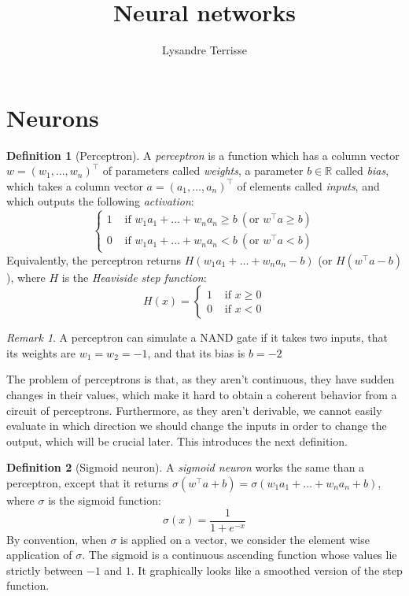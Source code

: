 \documentclass{article}
\title{Neural networks}
\author{Lysandre Terrisse}
\theoremstyle{definition}
\newtheorem{definition}{Definition}[section]
\theoremstyle{remark}
\newtheorem*{remark}{Remark}
\theoremstyle{example}
\newcommand{\tif}{\text{ if }}
\newcommand{\tor}{\text{or }}
\begin{document}
\maketitle

\section{Neurons}

\begin{definition}[Perceptron]
    A \textit{perceptron} is a function which has a column vector $w = (w_1, \dots, w_n)^\top$ of parameters called \textit{weights}, a parameter $b \in \mathbb{R}$ called \textit{bias}, which takes a column vector $a = (a_1, \dots, a_n)^\top$ of elements called \textit{inputs}, and which outputs the following \textit{activation}:
    $$\begin{cases}
        1 & \tif w_1 a_1 + \dots + w_n a_n \geq b ~ (\tor w^\top a \geq b)\\
        0 & \tif w_1 a_1 + \dots + w_n a_n < b ~ (\tor w^\top a < b)
    \end{cases}$$
    Equivalently, the perceptron returns $H(w_1 a_1 + \dots + w_n a_n - b)$ (or $H(w^\top a - b)$), where $H$ is the \textit{Heaviside step function}:
	$$H(x) = \begin{cases} 1 & \tif x \geq 0 \\ 0 & \tif x < 0 \end{cases}$$
\end{definition}

\begin{remark}
    A perceptron can simulate a NAND gate if it takes two inputs, that its weights are $w_1 = w_2 = -1$, and that its bias is $b = -2$
\end{remark}


The problem of perceptrons is that, as they aren't continuous, they have sudden changes in their values, which make it hard to obtain a coherent behavior from a circuit of perceptrons. Furthermore, as they aren't derivable, we cannot easily evaluate in which direction we should change the inputs in order to change the output, which will be crucial later. This introduces the next definition.

\begin{definition}[Sigmoid neuron]
    A \textit{sigmoid neuron} works the same than a perceptron, except that it returns $\sigma(w^\top a + b) = \sigma(w_1 a_1 + \dots + w_n a_n + b)$, where $\sigma$ is the sigmoid function:
        $$\sigma(x) = \frac{1}{1 + e^{-x}}$$
    By convention, when $\sigma$ is applied on a vector, we consider the element wise application of $\sigma$. The sigmoid is a continuous ascending function whose values lie strictly between $-1$ and $1$. It graphically looks like a smoothed version of the step function.
\end{definition}
\end{document}
